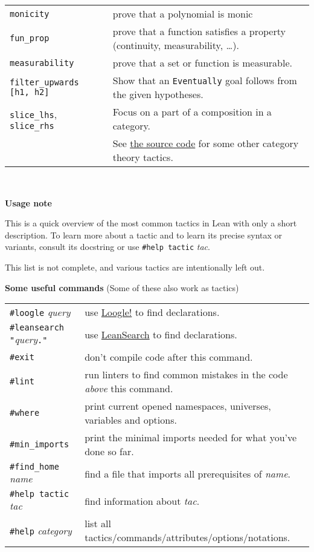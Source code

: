 \documentclass[a4paper]{article}
\newcommand{\lean}[1]{{\tt #1}}
\newcommand{\tactic}[1][]{\textit{tac#1}\xspace} %
\newcommand{\name}{\textit{name}\xspace}
\newcommand{\internet}{\faGlobe\xspace}
\begin{document}
\begin{center}
\begin{longtable}{@{}lp{113mm}@{}}
  \lean{monicity} & prove that a polynomial is monic \\
  \lean{fun\_prop} & prove that a function satisfies a property (continuity, measurability, \ldots). \\
  \lean{measurability} & prove that a set or function is measurable. \\
  \lean{filter\_upwards [h1, h2]} & Show that an \lean{Eventually} goal follows from the given hypotheses. \\
  \lean{slice\_lhs}, \lean{slice\_rhs} & Focus on a part of a composition in a category.\\
    & See \href{https://github.com/leanprover-community/mathlib4/tree/master/Mathlib/Tactic/CategoryTheory}{the source code} for some other category theory tactics. \\
  \bottomrule
\end{longtable}
\mbox{}\\
\end{center}

\textbf{Usage note}

This is a quick overview of the most common tactics in Lean with only a short description. To learn more about a tactic and to learn its precise syntax or variants, consult its docstring or use \lean{\#help tactic} \tactic.

This list is not complete, and various tactics are intentionally left out.
\bigskip

\textbf{Some useful commands} (Some of these also work as tactics)

\begin{longtable}{@{}lp{113mm}@{}}
\lean{\#loogle} \textit{query} & \internet use \href{https://loogle.lean-lang.org/}{Loogle!} to find declarations. \\
\lean{\#leansearch "}\textit{query}\lean{."} & \internet use \href{https://leansearch.net}{LeanSearch} to find declarations. \\
\lean{\#exit} & don't compile code after this command.\\
\lean{\#lint} & run linters to find common mistakes in the code \emph{above} this command.\\
\lean{\#where} & print current opened namespaces, universes, variables and options.\\
\lean{\#min\_imports} & print the minimal imports needed for what you've done so far.\\
\lean{\#find\_home} \name & find a file that imports all prerequisites of \name.\\
\lean{\#help tactic} \tactic & find information about \tactic.\\
\lean{\#help} \textit{category} & list all tactics/commands/attributes/options/notations.\\
\end{longtable}
\end{document}
